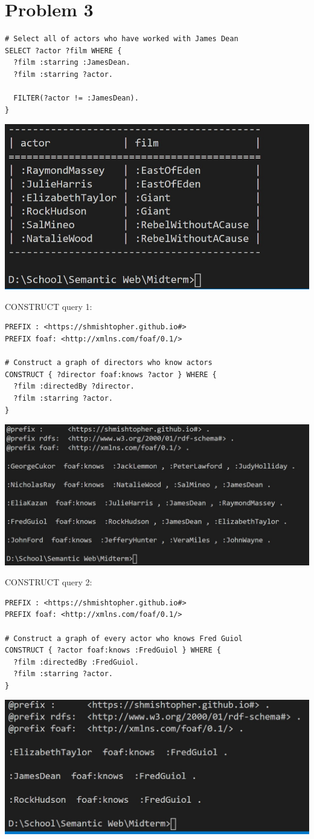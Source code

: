 \documentclass{article}
\newenvironment{problem}[1]{
  \nobreak\section*{Problem #1}
}{}
\begin{document}
\begin{problem}{3}
\begin{verbatim}
# Select all of actors who have worked with James Dean
SELECT ?actor ?film WHERE {
  ?film :starring :JamesDean.
  ?film :starring ?actor.

  FILTER(?actor != :JamesDean).
}
    \end{verbatim}
    \includegraphics{images/6.jpg}

    \pagebreak
    CONSTRUCT query 1:
    \begin{verbatim}
PREFIX : <https://shmishtopher.github.io#>
PREFIX foaf: <http://xmlns.com/foaf/0.1/>

# Construct a graph of directors who know actors
CONSTRUCT { ?director foaf:knows ?actor } WHERE {
  ?film :directedBy ?director.
  ?film :starring ?actor.
}
    \end{verbatim}
    \includegraphics{images/7.jpg}

    \pagebreak
    CONSTRUCT query 2:
    \begin{verbatim}
PREFIX : <https://shmishtopher.github.io#>
PREFIX foaf: <http://xmlns.com/foaf/0.1/>

# Construct a graph of every actor who knows Fred Guiol
CONSTRUCT { ?actor foaf:knows :FredGuiol } WHERE {
  ?film :directedBy :FredGuiol.
  ?film :starring ?actor.
}
    \end{verbatim}
    \includegraphics{images/8.jpg}


\end{problem}
\end{document}
